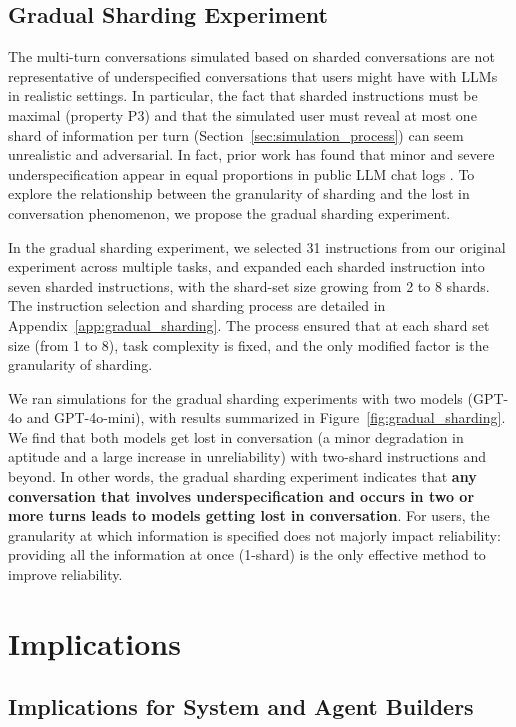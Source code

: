\documentclass{article}
\begin{document}
\subsection{Gradual Sharding Experiment} \label{sec:gradual_sharding}

The multi-turn conversations simulated based on sharded conversations are not representative of underspecified conversations that users might have with LLMs in realistic settings. In particular, the fact that sharded instructions must be maximal (property P3) and that the simulated user must reveal at most one shard of information per turn (Section~\ref{sec:simulation_process}) can seem unrealistic and adversarial. In fact, prior work has found that minor and severe underspecification appear in equal proportions in public LLM chat logs \cite{herlihy2024overcoming}. To explore the relationship between the granularity of sharding and the lost in conversation phenomenon, we propose the gradual sharding experiment.

In the gradual sharding experiment, we selected 31 instructions from our original experiment across multiple tasks, and expanded each sharded instruction into seven sharded instructions, with the shard-set size growing from 2 to 8 shards. The instruction selection and sharding process are detailed in Appendix~\ref{app:gradual_sharding}. The process ensured that at each shard set size (from 1 to 8), task complexity is fixed, and the only modified factor is the granularity of sharding.

We ran simulations for the gradual sharding experiments with two models (GPT-4o and GPT-4o-mini), with results summarized in Figure~\ref{fig:gradual_sharding}. We find that both models get lost in conversation (a minor degradation in aptitude and a large increase in unreliability) with two-shard instructions and beyond. In other words, the gradual sharding experiment indicates that \textbf{any conversation that involves underspecification and occurs in two or more turns leads to models getting lost in conversation}. For users, the granularity at which information is specified does not majorly impact reliability: providing all the information at once (1-shard) is the only effective method to improve reliability.

\section{Implications} \label{sec:implications}

\subsection{Implications for System and Agent Builders} \label{sec:implications_systems}
\end{document}
